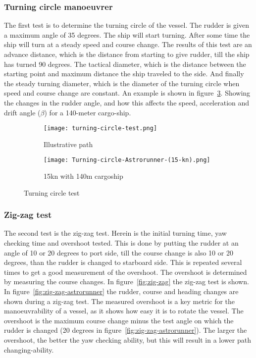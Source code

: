 \subsubsection{Turning circle manoeuvrer}
The first test is to determine the turning circle of the vessel. The rudder is given a maximum angle of 35 degrees. The ship will start turning. After some time the ship will turn at a steady speed and course change. The results of this test are an advance distance, which is the distance from starting to give rudder, till the ship has turned 90 degrees. The tactical diameter, which is the distance between the starting point and maximum distance the ship traveled to the side. And finally the steady turning diameter, which is the diameter of the turning circle when speed and course change are constant. An example is shown in figure~\ref{fig:turning-circle}. Showing the changes in the rudder angle, and how this affects the speed, acceleration and drift angle ($\beta$) for a 140-meter cargo-ship.

\begin{figure}[p]
	\begin{subfigure}[b]{0.43\linewidth}
		\centering
		\texttt{[image: turning-circle-test.png]}
		\caption{Illustrative path}
		\label{fig:turning-circle-path}
	\end{subfigure} 
	\begin{subfigure}[b]{0.56\linewidth}
		\centering
		\texttt{[image: Turning-circle-Astrorunner-(15-kn).png]}
		\caption{15kn with 140m cargoship}
		\label{fig:turning-circle-astrorunner}
	\end{subfigure}
	\caption{Turning circle test}
	\label{fig:turning-circle} 
\end{figure}

\subsubsection{Zig-zag test}
The second test is the zig-zag test. Herein is the initial turning time, yaw checking time and overshoot tested. This is done by putting the rudder at an angle of 10 or 20 degrees to port side, till the course change is also 10 or 20 degrees, than the rudder is changed to starboard side. This is repeated several times to get a good measurement of the overshoot. The overshoot is determined by measuring the course changes. In figure~\ref{fig:zig-zag} the zig-zag test is shown. In figure~\ref{fig:zig-zag-astrorunner} the rudder, course and heading changes are shown during a zig-zag test. The measured overshoot is a key metric for the manoeuvrability of a vessel, as it shows how easy it is to rotate the vessel. The overshoot is the maximum course change minus the test angle on which the rudder is changed (20 degrees in figure~\ref{fig:zig-zag-astrorunner}). The larger the overshoot, the better the yaw checking ability, but this will result in a lower path changing-ability.

